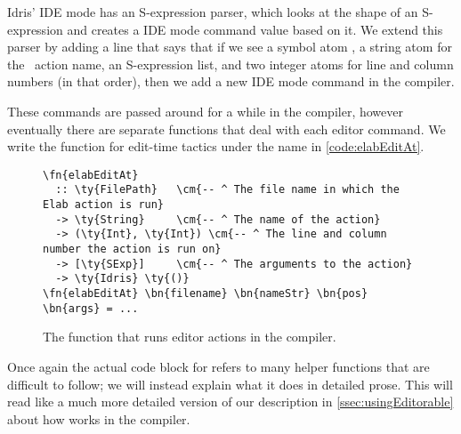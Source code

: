 Idris' IDE mode has an S-expression parser, which looks at the shape of an
S-expression and creates a IDE mode command value based on it. We extend this
parser by adding a line that says that if we see a symbol atom ,
a string atom for the \Elab\ action name, an S-expression list, and two integer
atoms for line and column numbers (in that order), then we add a new IDE mode
command in the compiler.

These commands are passed around for a while in the compiler, however
eventually there are separate functions that deal with each editor command. We
write the function for edit-time tactics under the name  in
\autoref{code:elabEditAt}.

\begin{figure}[ht]
\caption{The function  that runs editor actions in the compiler.}
\label{code:elabEditAt}
\begin{Verbatim}[framesep=2mm, label=\footnotesize{\normalfont{Haskell}}, labelposition=topline]
\fn{elabEditAt}
  :: \ty{FilePath}   \cm{-- ^ The file name in which the Elab action is run}
  -> \ty{String}     \cm{-- ^ The name of the action}
  -> (\ty{Int}, \ty{Int}) \cm{-- ^ The line and column number the action is run on}
  -> [\ty{SExp}]     \cm{-- ^ The arguments to the action}
  -> \ty{Idris} \ty{()}
\fn{elabEditAt} \bn{filename} \bn{nameStr} \bn{pos} \bn{args} = ...
\end{Verbatim}
\end{figure}

Once again the actual code block for  refers to many helper
functions that are difficult to follow; we will instead explain what it does in
detailed prose. This will read like a much more detailed version of our
description in \autoref{ssec:usingEditorable} about how  works
in the compiler.

